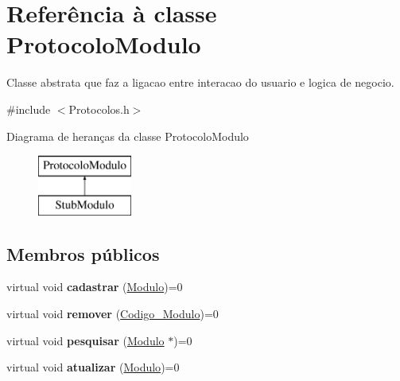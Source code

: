 \hypertarget{class_protocolo_modulo}{
\section{\-Referência à classe \-Protocolo\-Modulo}
\label{class_protocolo_modulo}
}


\-Classe abstrata que faz a ligacao entre interacao do usuario e logica de negocio.  




{\ttfamily \#include $<$\-Protocolos.\-h$>$}

\-Diagrama de heranças da classe \-Protocolo\-Modulo\begin{figure}[H]
\begin{center}
\leavevmode
\includegraphics[height=2.000000cm]{class_protocolo_modulo}
\end{center}
\end{figure}
\subsection*{\-Membros públicos}
\begin{DoxyCompactItemize}
\item 
\hypertarget{class_protocolo_modulo_ad6f6717bb7e03a2b8017afbdbd472e9e}{
virtual void {\bfseries cadastrar} (\hyperlink{class_modulo}{\-Modulo})=0}
\label{class_protocolo_modulo_ad6f6717bb7e03a2b8017afbdbd472e9e}

\item 
\hypertarget{class_protocolo_modulo_ad7d56410221ef77347232fa254a0ec03}{
virtual void {\bfseries remover} (\hyperlink{class_codigo___modulo}{\-Codigo\-\_\-\-Modulo})=0}
\label{class_protocolo_modulo_ad7d56410221ef77347232fa254a0ec03}

\item 
\hypertarget{class_protocolo_modulo_abb9e97a7755972298153d6a114a08d30}{
virtual void {\bfseries pesquisar} (\hyperlink{class_modulo}{\-Modulo} $\ast$)=0}
\label{class_protocolo_modulo_abb9e97a7755972298153d6a114a08d30}

\item 
\hypertarget{class_protocolo_modulo_adfbd16b2b159b44347f34a1066292b3e}{
virtual void {\bfseries atualizar} (\hyperlink{class_modulo}{\-Modulo})=0}
\label{class_protocolo_modulo_adfbd16b2b159b44347f34a1066292b3e}

\end{DoxyCompactItemize}


